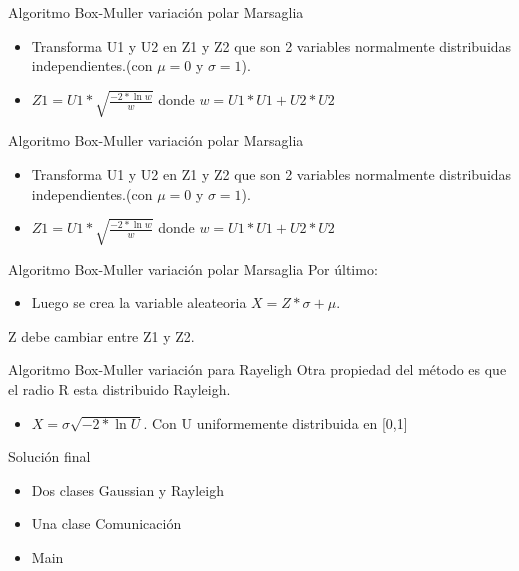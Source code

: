 \documentclass[pdf]{beamer}
\begin{document}
\begin{frame}{Algoritmo Box-Muller variación polar Marsaglia}
\begin{itemize}
\item Transforma U1 y U2 en Z1 y Z2 que son 2 variables normalmente distribuidas independientes.(con $\mu=0$ y $\sigma = 1$).\\
\item $Z1 = U1* \sqrt{\frac{-2 * \ln w}{w}}$ donde $w = U1*U1 +U2*U2$
\end{itemize}
\end{frame}
\begin{frame}{Algoritmo Box-Muller variación polar Marsaglia}
\begin{itemize}
\item Transforma U1 y U2 en Z1 y Z2 que son 2 variables normalmente distribuidas independientes.(con $\mu=0$ y $\sigma = 1$).\\
\item $Z1 = U1* \sqrt{\frac{-2 * \ln w}{w}}$ donde $w = U1*U1 +U2*U2$
\end{itemize}
\end{frame}
\begin{frame}{Algoritmo Box-Muller variación polar Marsaglia}
Por último:
\begin{itemize}
\item Luego se crea la variable aleateoria $ X= Z * \sigma + \mu $. 
\end{itemize}
Z debe cambiar entre Z1 y Z2.

\end{frame}
\begin{frame}{Algoritmo Box-Muller variación para Rayeligh}
Otra propiedad del método es que el radio R esta distribuido Rayleigh.
\begin{itemize}
\item $X = \sigma \sqrt{-2*\ln U}$. Con U uniformemente distribuida en [0,1]
\end{itemize}
\end{frame}
\begin{frame}{Solución final}

\begin{itemize}
\item Dos clases Gaussian y Rayleigh
\item Una clase Comunicación
\item Main
\end{itemize}

\end{frame}
\end{document}

